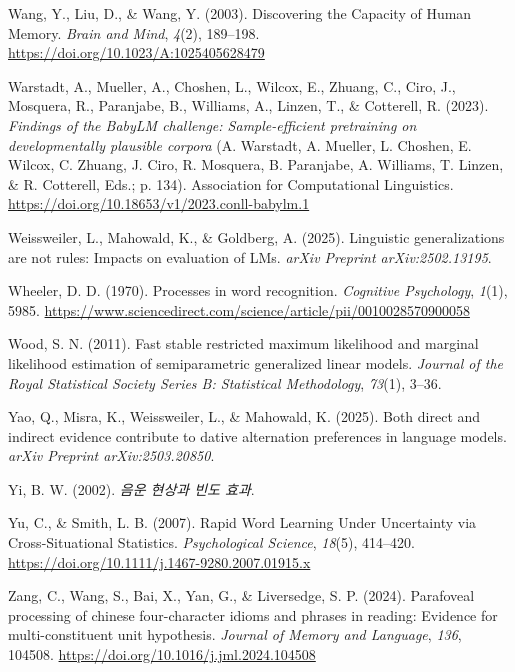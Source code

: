 \documentclass[
  12pt,
  letterpaper,
]{scrreport}
\newlength{\cslhangindent}
\newenvironment{CSLReferences}[2] %
 {\begin{list}{}{%
  \setlength{\itemindent}{0pt}
  \setlength{\leftmargin}{0pt}
  \setlength{\parsep}{0pt}
  \ifodd #1
   \setlength{\leftmargin}{\cslhangindent}
   \setlength{\itemindent}{-1\cslhangindent}
  \fi
  \setlength{\itemsep}{#2\baselineskip}}}
 {\end{list}}
\begin{document}
\begin{CSLReferences}{1}{0}
Wang, Y., Liu, D., \& Wang, Y. (2003). Discovering the Capacity of Human
Memory. \emph{Brain and Mind}, \emph{4}(2), 189--198.
\url{https://doi.org/10.1023/A:1025405628479}

Warstadt, A., Mueller, A., Choshen, L., Wilcox, E., Zhuang, C., Ciro,
J., Mosquera, R., Paranjabe, B., Williams, A., Linzen, T., \& Cotterell,
R. (2023). \emph{Findings of the BabyLM challenge: Sample-efficient
pretraining on developmentally plausible corpora} (A. Warstadt, A.
Mueller, L. Choshen, E. Wilcox, C. Zhuang, J. Ciro, R. Mosquera, B.
Paranjabe, A. Williams, T. Linzen, \& R. Cotterell, Eds.; p. 134).
Association for Computational Linguistics.
\url{https://doi.org/10.18653/v1/2023.conll-babylm.1}

Weissweiler, L., Mahowald, K., \& Goldberg, A. (2025). Linguistic
generalizations are not rules: Impacts on evaluation of LMs. \emph{arXiv
Preprint arXiv:2502.13195}.

Wheeler, D. D. (1970). Processes in word recognition. \emph{Cognitive
Psychology}, \emph{1}(1), 5985.
\url{https://www.sciencedirect.com/science/article/pii/0010028570900058}

Wood, S. N. (2011). Fast stable restricted maximum likelihood and
marginal likelihood estimation of semiparametric generalized linear
models. \emph{Journal of the Royal Statistical Society Series B:
Statistical Methodology}, \emph{73}(1), 3--36.

Yao, Q., Misra, K., Weissweiler, L., \& Mahowald, K. (2025). Both direct
and indirect evidence contribute to dative alternation preferences in
language models. \emph{arXiv Preprint arXiv:2503.20850}.

Yi, B. W. (2002). \emph{음운 현상과 빈도 효과}.

Yu, C., \& Smith, L. B. (2007). Rapid Word Learning Under Uncertainty
via Cross-Situational Statistics. \emph{Psychological Science},
\emph{18}(5), 414--420.
\url{https://doi.org/10.1111/j.1467-9280.2007.01915.x}

Zang, C., Wang, S., Bai, X., Yan, G., \& Liversedge, S. P. (2024).
Parafoveal processing of chinese four-character idioms and phrases in
reading: Evidence for multi-constituent unit hypothesis. \emph{Journal
of Memory and Language}, \emph{136}, 104508.
\url{https://doi.org/10.1016/j.jml.2024.104508}


\end{CSLReferences}
\end{document}
